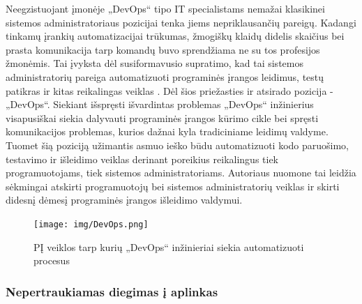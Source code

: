 \documentclass{VUMIFPSkursinis}
\begin{document}
Neegzistuojant įmonėje „DevOps“ tipo IT specialistams nemažai klasikinei sistemos administratoriaus pozicijai tenka jiems nepriklausančių pareigų. Kadangi tinkamų įrankių automatizacijai trūkumas, žmogiškų klaidų didelis skaičius bei prasta komunikacija tarp komandų buvo sprendžiama ne su tos profesijos žmonėmis. Tai įvyksta dėl susiformavusio supratimo, kad tai sistemos administratorių pareiga automatizuoti programinės įrangos leidimus, testų patikras ir kitas reikalingas veiklas \cite{SaltTrecias}. Dėl šios priežasties ir atsirado pozicija - „DevOps“. Siekiant išspręsti išvardintas problemas „DevOps“ inžinierius visapusiškai siekia dalyvauti programinės įrangos kūrimo cikle bei spręsti komunikacijos problemas, kurios dažnai kyla tradiciniame leidimų valdyme. Tuomet šią poziciją užimantis asmuo ieško būdu automatizuoti kodo paruošimo, testavimo ir išleidimo veiklas derinant poreikius reikalingus tiek programuotojams, tiek sistemos administratoriams. Autoriaus nuomone tai leidžia sėkmingai atskirti programuotojų bei sistemos administratorių veiklas ir skirti didesnį dėmesį programinės įrangos išleidimo valdymui.

\begin{figure}[H]
    \centering
    \texttt{[image: img/DevOps.png]}
    \caption{PĮ veiklos tarp kurių „DevOps“ inžinieriai siekia automatizuoti procesus}
    \label{img:mlp}
\end{figure}

    \subsubsection{Nepertraukiamas diegimas į aplinkas}
    
\end{document}

